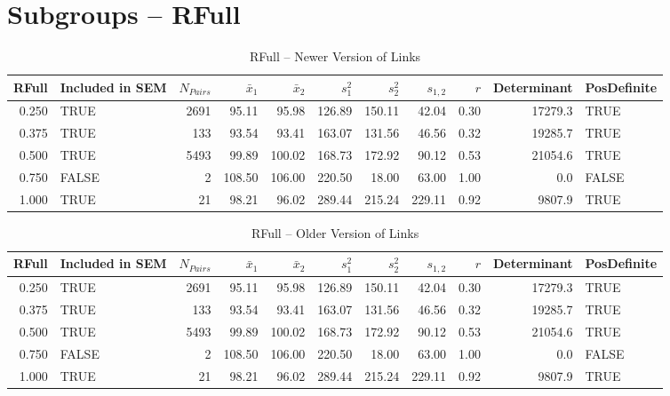 \documentclass{article}\usepackage[]{graphicx}\usepackage[]{color}
\begin{document}
\section{Subgroups --  RFull }%
\begin{table}[ht]
\centering
\begin{tabular}{rlrrrrrrrrl}
  \hline
RFull & Included in SEM & $N_{Pairs}$ & $\bar{x}_1$ & $\bar{x}_2$ & $s_1^2$ & $s_2^2$ & $s_{1,2}$ & $r$ & Determinant & PosDefinite \\ 
  \hline
0.250 & TRUE & 2691 & 95.11 & 95.98 & 126.89 & 150.11 & 42.04 & 0.30 & 17279.3 & TRUE \\ 
  0.375 & TRUE & 133 & 93.54 & 93.41 & 163.07 & 131.56 & 46.56 & 0.32 & 19285.7 & TRUE \\ 
  0.500 & TRUE & 5493 & 99.89 & 100.02 & 168.73 & 172.92 & 90.12 & 0.53 & 21054.6 & TRUE \\ 
  0.750 & FALSE & 2 & 108.50 & 106.00 & 220.50 & 18.00 & 63.00 & 1.00 & 0.0 & FALSE \\ 
  1.000 & TRUE & 21 & 98.21 & 96.02 & 289.44 & 215.24 & 229.11 & 0.92 & 9807.9 & TRUE \\ 
   \hline
\end{tabular}
\caption{RFull -- Newer Version of Links} 
\end{table}
\begin{table}[ht]
\centering
\begin{tabular}{rlrrrrrrrrl}
  \hline
RFull & Included in SEM & $N_{Pairs}$ & $\bar{x}_1$ & $\bar{x}_2$ & $s_1^2$ & $s_2^2$ & $s_{1,2}$ & $r$ & Determinant & PosDefinite \\ 
  \hline
0.250 & TRUE & 2691 & 95.11 & 95.98 & 126.89 & 150.11 & 42.04 & 0.30 & 17279.3 & TRUE \\ 
  0.375 & TRUE & 133 & 93.54 & 93.41 & 163.07 & 131.56 & 46.56 & 0.32 & 19285.7 & TRUE \\ 
  0.500 & TRUE & 5493 & 99.89 & 100.02 & 168.73 & 172.92 & 90.12 & 0.53 & 21054.6 & TRUE \\ 
  0.750 & FALSE & 2 & 108.50 & 106.00 & 220.50 & 18.00 & 63.00 & 1.00 & 0.0 & FALSE \\ 
  1.000 & TRUE & 21 & 98.21 & 96.02 & 289.44 & 215.24 & 229.11 & 0.92 & 9807.9 & TRUE \\ 
   \hline
\end{tabular}
\caption{RFull -- Older Version of Links} 
\end{table}
\end{document}
